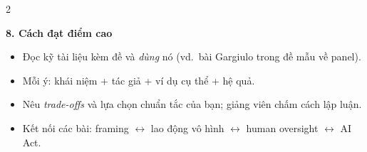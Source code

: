 \documentclass[10pt]{article}
\newcommand{\sect}[1]{\par\vspace{6pt}\noindent\colorbox{h1}{\parbox{\dimexpr\linewidth-2\fboxsep}{\large\bfseries\color{white}#1}}\par\vspace{2pt}}
\begin{document}
\begin{multicols}{2}
\sect{8. Cách đạt điểm cao}
\begin{itemize}
\item Đọc kỹ tài liệu kèm đề và \emph{dùng} nó (vd.\ bài Gargiulo trong đề mẫu về panel).
\item Mỗi ý: khái niệm + tác giả + ví dụ cụ thể + hệ quả.
\item Nêu \emph{trade-offs} và lựa chọn chuẩn tắc của bạn; giảng viên chấm cách lập luận.
\item Kết nối các bài: framing $\leftrightarrow$ lao động vô hình $\leftrightarrow$ human oversight $\leftrightarrow$ AI Act.
\end{itemize}
\end{multicols}
\end{document}
